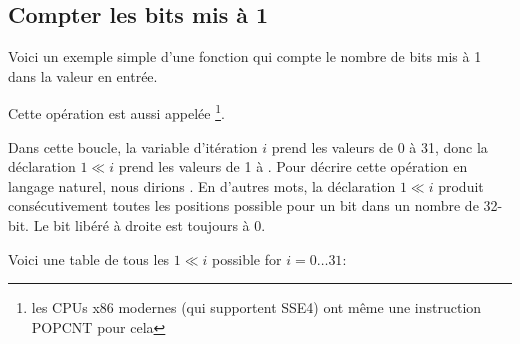 ﻿\subsection{Compter les bits mis à 1}

Voici un exemple simple d'une fonction qui compte le nombre de bits mis à 1 dans
la valeur en entrée.

Cette opération est aussi appelée \footnote{les CPUs x86 modernes
(qui supportent SSE4) ont même une instruction POPCNT pour cela}.



Dans cette boucle, la variable d'itération $i$ prend les valeurs de 0 à 31, donc
la déclaration $1 \ll i$ prend les valeurs de 1 à .
Pour décrire cette opération en langage naturel, nous dirions .
En d'autres mots, la déclaration $1 \ll i$ produit consécutivement toutes les positions
possible pour un bit dans un nombre de 32-bit.
Le bit libéré à droite est toujours à 0.

\label{2n_numbers_table}
Voici une table de tous les $1 \ll i$ possible
for $i=0 \ldots 31$:

